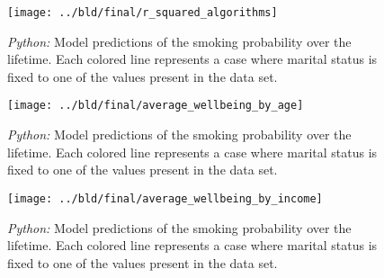 \documentclass[11pt, a4paper, leqno]{article}
\begin{document}
\begin{figure}[htbp]
    \centering
    \texttt{[image: ../bld/final/r\_squared\_algorithms]}
    \caption{\emph{Python:} Model predictions of the smoking probability over the lifetime. Each colored line represents a case where marital status is fixed to one of the values present in the data set.}
    \label{fig:r_squared_algorithms}
\end{figure}


\begin{figure}[htbp]
    \centering
    \texttt{[image: ../bld/final/average\_wellbeing\_by\_age]}
    \caption{\emph{Python:} Model predictions of the smoking probability over the lifetime. Each colored line represents a case where marital status is fixed to one of the values present in the data set.}
    \label{fig:average_wellbeing_by_age}
\end{figure}

\begin{figure}[htbp]
    \centering
    \texttt{[image: ../bld/final/average\_wellbeing\_by\_income]}
    \caption{\emph{Python:} Model predictions of the smoking probability over the lifetime. Each colored line represents a case where marital status is fixed to one of the values present in the data set.}
    \label{fig:average_wellbeing_by_income}
\end{figure}







\printbibliography
{}



\end{document}
